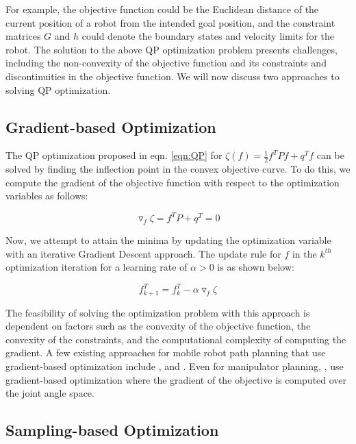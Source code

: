 For example, the objective function could be the Euclidean distance of the current position of a robot from the intended goal position, and the constraint matrices $G$ and $h$ could denote the boundary states and velocity limits for the robot. The solution to the above QP optimization problem presents challenges, including the non-convexity of the objective function and its constraints and discontinuities in the objective function. We will now discuss two approaches to solving QP optimization.

\subsection{Gradient-based Optimization}\label{sec:gradient-optim}
The QP optimization proposed in eqn. \ref{eqn:QP} for $\zeta(f) = \frac{1}{2}f^TPf + q^Tf$ can be solved by finding the inflection point in the convex objective curve. To do this, we compute the gradient of the objective function with respect to the optimization variables as follows:


\begin{equation}
    \triangledown_{f}{\zeta} = f^TP + q^T = 0
    \label{eqn:gradient}
\end{equation}

Now, we attempt to attain the minima by updating the optimization variable with an iterative Gradient Descent approach. The update rule for $f$ in the $k^{th}$ optimization iteration for a learning rate of $\alpha > 0$ is as shown below:

\begin{equation}
    f_{k+1}^T = f_k^T - \alpha \triangledown_{f}{\zeta}
\end{equation}

The feasibility of solving the optimization problem with this approach is dependent on factors such as the convexity of the objective function, the convexity of the constraints, and the computational complexity of computing the gradient. A few existing approaches for mobile robot path planning that use gradient-based optimization include \cite{aks_ral21}, and \cite{CDC_time_scaling}. Even for manipulator planning, \cite{CHOMP}, \cite{STOMP} use gradient-based optimization where the gradient of the objective is computed over the joint angle space. 

\subsection{Sampling-based Optimization}\label{sec:sampling-optim}

